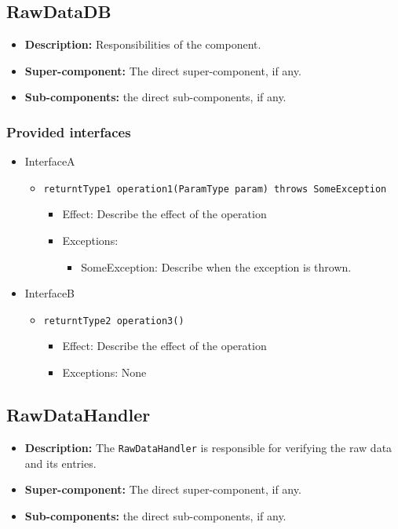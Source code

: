 \documentclass[a4paper,10pt]{article}
\begin{document}
\subsection{RawDataDB}
\begin{itemize}
    \item \textbf{Description:} Responsibilities of the component.
    \item \textbf{Super-component:} The direct super-component, if any.
    \item \textbf{Sub-components:} the direct sub-components, if any.
\end{itemize}

\subsubsection*{Provided interfaces}
\begin{itemize}
    \item InterfaceA
    \begin{itemize}
        \item \texttt{returntType1 operation1(ParamType param) throws SomeException}
        \begin{itemize}
            \item Effect: Describe the effect of the operation
            \item Exceptions:
            \begin{itemize}
                \item SomeException: Describe when the exception is thrown.
            \end{itemize}
        \end{itemize}
    \end{itemize}

    \item InterfaceB
    \begin{itemize}
        \item \texttt{returntType2 operation3()}
        \begin{itemize}
            \item Effect: Describe the effect of the operation
            \item Exceptions: None
        \end{itemize}
    \end{itemize}
\end{itemize}

\subsection{RawDataHandler}
\begin{itemize}
    \item \textbf{Description:} The \texttt{RawDataHandler} is responsible for verifying the raw data and its entries.
    \item \textbf{Super-component:} The direct super-component, if any.
    \item \textbf{Sub-components:} the direct sub-components, if any.
\end{itemize}
\end{document}
